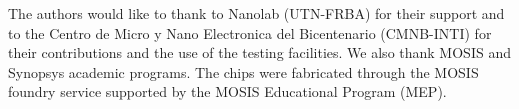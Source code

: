 The authors would like to thank to Nanolab (UTN-FRBA) for their support and to the Centro de Micro y Nano Electronica del Bicentenario (CMNB-INTI) \cite{cmnb} for their contributions and the use of the testing facilities. 
We also thank MOSIS and Synopsys \cite{synopsys} academic programs. The chips were fabricated through the MOSIS foundry service supported by the MOSIS Educational Program (MEP).